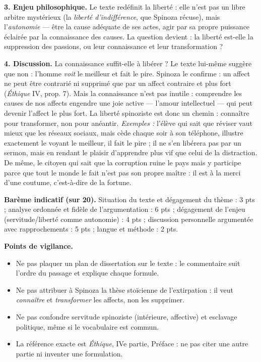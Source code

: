 \documentclass[11pt]{article}
\begin{document}
\begin{corrige}
\textbf{3. Enjeu philosophique.} Le texte redéfinit la liberté : elle n'est pas un libre arbitre mystérieux (la \emph{liberté d'indifférence}, que Spinoza récuse), mais l'\emph{autonomie} — être la cause adéquate de ses actes, agir par sa propre puissance éclairée par la connaissance des causes. La question devient : la liberté est-elle la suppression des passions, ou leur connaissance et leur transformation ?

\textbf{4. Discussion.} La connaissance suffit-elle à libérer ? Le texte lui-même suggère que non : l'homme \emph{voit} le meilleur et fait le pire. Spinoza le confirme : \guillemotleft un affect ne peut être contrarié ni supprimé que par un affect contraire et plus fort \guillemotright{} (\emph{Éthique} IV, prop. 7). Mais la connaissance n'est pas inutile : comprendre les causes de nos affects engendre une joie active — l'amour intellectuel — qui peut devenir l'affect le plus fort. La liberté spinoziste est donc un chemin : connaître pour transformer, non pour anéantir. \emph{Exemples :} l'élève qui sait que réviser vaut mieux que les réseaux sociaux, mais cède chaque soir à son téléphone, illustre exactement le \guillemotleft voyant le meilleur, il fait le pire \guillemotright{} ; il ne s'en libérera pas par un sermon, mais en rendant le plaisir d'apprendre plus vif que celui de la distraction. De même, le citoyen qui sait que la corruption ruine le pays mais y participe \guillemotleft parce que tout le monde le fait \guillemotright{} n'est pas son propre maître : il est à la merci d'une coutume, c'est-à-dire de la fortune.

\textbf{Barème indicatif (sur 20).} Situation du texte et dégagement du thème : 3 pts ; analyse ordonnée et fidèle de l'argumentation : 6 pts ; dégagement de l'enjeu (servitude/liberté comme autonomie) : 4 pts ; discussion personnelle argumentée avec rapprochements : 5 pts ; langue et méthode : 2 pts.

\textbf{Points de vigilance.}
\begin{itemize}
\item Ne pas plaquer un plan de dissertation sur le texte : le commentaire suit l'ordre du passage et explique chaque formule.
\item Ne pas attribuer à Spinoza la thèse stoïcienne de l'extirpation : il veut \emph{connaître} et \emph{transformer} les affects, non les supprimer.
\item Ne pas confondre servitude spinoziste (intérieure, affective) et esclavage politique, même si le vocabulaire est commun.
\item La référence exacte est \emph{Éthique}, IVe partie, Préface : ne pas citer une autre partie ni inventer une formulation.
\end{itemize}

\end{corrige}
\end{document}
